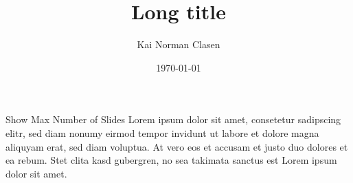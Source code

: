 \documentclass[aspectratio=169]{beamer}
\title[Show Max Number of Slides]{Long title}
\author{Kai Norman Clasen}
\institute{}
\date{\today}
\begin{document}
  \begin{frame}{Show Max Number of Slides}
    Lorem ipsum dolor sit amet, consetetur sadipscing elitr, 
    sed diam nonumy eirmod tempor invidunt ut labore et dolore 
    magna aliquyam erat, sed diam voluptua. 
    At vero eos et accusam et justo duo dolores et ea rebum. 
    Stet clita kasd gubergren, no sea takimata sanctus est 
    Lorem ipsum dolor sit amet.
  \end{frame}
\end{document}
